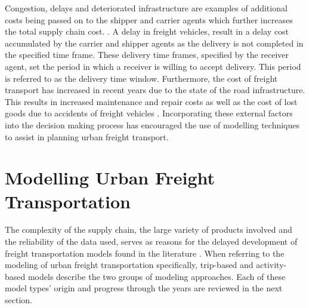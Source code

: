 Congestion, delays and deteriorated infrastructure are examples of additional costs being passed on to the shipper and carrier agents which further increases the total supply chain cost.  \citep{giuliano2013synthesis}. A delay in freight vehicles, result in a delay cost accumulated by the carrier and shipper agents \citep{giuliano2013synthesis} as the delivery is not completed in the specified time frame. These delivery time frames, specified by the receiver agent, set the period in which a receiver is willing to accept delivery. This period is referred to as the delivery time window. Furthermore, the cost of freight transport has increased in recent years due to the state of the road infrastructure. This results in increased maintenance and repair costs as well as the cost of lost goods due to accidents of freight vehicles \citep{havenga2011case}. Incorporating these external factors into the decision making process has encouraged the use of modelling techniques to assist in planning urban freight transport. \par




\section{Modelling Urban Freight Transportation}

The complexity of the supply chain, the large variety of products involved and the reliability of the data used, serves as reasons for the delayed development of freight transportation models found in the literature \citep{joubert2010large}. When referring to the modeling of urban freight transportation specifically, trip-based and activity-based models describe the two groups of modeling approaches. Each of these model types' origin and progress through the years are reviewed in the next section.



